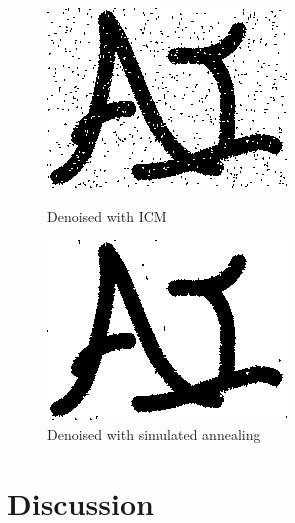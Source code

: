 \documentclass{article}
\begin{document}
\begin{figure}[H]
	\centering
	\begin{minipage}[b]{0.45\linewidth}
		\centering
		\includegraphics[width=180pt]{../img/icm.png}
		\caption{Denoised with ICM}
	\end{minipage}
	\begin{minipage}[b]{0.45\linewidth}
		\centering
		\includegraphics[width=180pt]{../img/best.png}
		\caption{Denoised with simulated annealing}
	\end{minipage}
\end{figure}

\section{Discussion}


\end{document}
